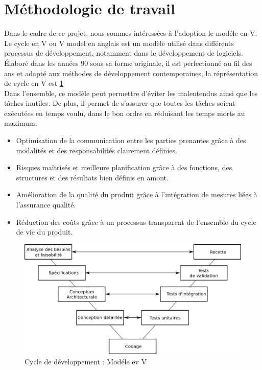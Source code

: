 \documentclass[12pt]{report}
\begin{document}
\section{Méthodologie de travail}
Dans le cadre de ce projet, nous sommes intéressées à l’adoption le modéle en V.\\
Le cycle en V ou V model en anglais est un modèle utilisé dans différents processus de développement, notamment dans le développement de logiciels. Élaboré dans les années 90 sous sa forme originale, il est perfectionné au fil des ans et adapté aux méthodes de développement contemporaines, la réprésentation de cycle en V est \ref{fig:cycleenv}\\
Dans l’ensemble, ce modèle peut permettre d’éviter les malentendus ainsi que les tâches inutiles. De plus, il permet de s’assurer que toutes les tâches soient exécutées en temps voulu, dans le bon ordre en réduisant les temps morts au maximum.
\begin{itemize}
\item Optimisation de la communication entre les parties prenantes grâce à des modalités et des responsabilités clairement définies.
\item Risques maîtrisés et meilleure planification grâce à des fonctions, des structures et des résultats bien définis en amont.
\item Amélioration de la qualité du produit grâce à l’intégration de mesures liées à l’assurance qualité.
\item Réduction des coûts grâce à un processus transparent de l’ensemble du cycle de vie du produit.
\end{itemize}

\begin{figure}[h]
    \centering
    \includegraphics[width=1\textwidth]{cyclev}
    \caption{Cycle de développement : Modéle ev V}
    \label{fig:cycleenv}
\end{figure}
\end{document}

